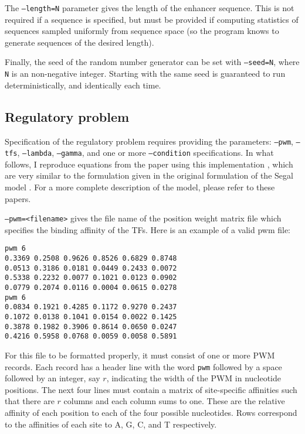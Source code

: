 \documentclass[11pt]{article}
\begin{document}
The \texttt{--length=N} parameter gives the length of the enhancer sequence. This is not required if a sequence is specified, but must be provided if computing statistics of sequences sampled uniformly from sequence space (so the program knows to generate sequences of the desired length).

Finally, the seed of the random number generator can be set with \texttt{--seed=N}, where \texttt{N} is an non-negative integer. Starting with the same seed is guaranteed to run deterministically, and identically each time.

\subsection*{Regulatory problem}

Specification of the regulatory problem requires providing the parameters: \texttt{--pwm}, \texttt{--tfs}, \texttt{--lambda}, \texttt{--gamma}, and one or more \texttt{--condition} specifications. In what follows, I reproduce equations from the paper using this implementation \cite{KLBullaughey11232010}, which are very similar to the formulation given in the original formulation of the Segal model \cite{Segal:2008fk}. For a more complete description of the model, please refer to these papers.

\texttt{--pwm=<filename>} gives the file name of the position weight matrix file which specifies the binding affinity of the TFs. Here is an example of a valid pwm file:

\begin{verbatim}
pwm 6
0.3369 0.2508 0.9626 0.8526 0.6829 0.8748 
0.0513 0.3186 0.0181 0.0449 0.2433 0.0072 
0.5338 0.2232 0.0077 0.1021 0.0123 0.0902 
0.0779 0.2074 0.0116 0.0004 0.0615 0.0278 
pwm 6
0.0834 0.1921 0.4285 0.1172 0.9270 0.2437 
0.1072 0.0138 0.1041 0.0154 0.0022 0.1425 
0.3878 0.1982 0.3906 0.8614 0.0650 0.0247 
0.4216 0.5958 0.0768 0.0059 0.0058 0.5891 
\end{verbatim}

For this file to be formatted properly, it must consist of one or more PWM records. Each record has a header line with the word \texttt{pwm} followed by a space followed by an integer, say $r$, indicating the width of the PWM in nucleotide positions. The next four lines must contain a matrix of site-specific affinities such that there are $r$ columns and each column sums to one. These are the relative affinity of each position to each of the four possible nucleotides. Rows correspond to the affinities of each site to A, G, C, and T respectively.
\end{document}
